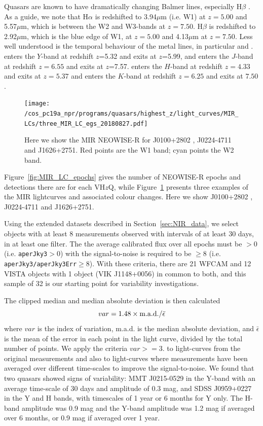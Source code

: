 \documentclass[usenatbib]{mnras}
\begin{document}
Quasars are known to have dramatically changing Balmer lines,
especially H$\beta$ \citep[e.g.,][]{LaMassa2015, Ruan2016, Runnoe2016,
Macleod2016, Gezari2017, Runco2016, YangQ2018, Assef2018, Stern2018,
Ross2018, MacLeod2019, Graham2019}. As a guide, we note that H$\alpha$
is redshifted to 3.94$\mu$m (i.e. W1) at $z=5.00$ and 5.57$\mu$m,
which is between the W2 and W3-bands at $z=7.50$.  H$\beta$ is
redshifted to 2.92$\mu$m, which is the blue edge of W1, at $z=5.00$
and 4.13$\mu$m at $z=7.50$. Less well understood is the temporal
behaviour of the metal lines, in particular \civ and \mgii.  \civ
enters the $Y$-band at redshift $z$=5.32 and exits at $z$=5.99, and
enters the $J$-band at redshift $z=6.55$ and exits at $z$=7.57. \mgii
enters the $H$-band at redshift $z=4.33$ and exits at $z=5.37$ and
enters the $K$-band at redshift $z=6.25$ and exits at $7.50$.


\begin{figure}
  \texttt{[image: /cos\_pc19a\_npr/programs/quasars/highest\_z/light\_curves/MIR\_LCs/three\_MIR\_LC\_egs\_20180827.pdf]}
  \centering
  \caption[]
  {Here we show the MIR NEOWISE-R for J0100+2802 \citep{Wu2015}, J0224-4711 and  J1626+2751. 
    Red points are the W1 band; cyan points the W2 band.} 
  \label{fig:MIR_LC_3egs}
\end{figure}
Figure~\ref{fig:MIR_LC_epochs} gives the number of NEOWISE-R epochs
and detections there are for each VH$z$Q, while
Figure~\ref{fig:MIR_LC_3egs} presents three examples of the MIR
lightcurves and associated colour changes. Here we show J0100+2802
\citep{Wu2015}, J0224-4711 and J1626+2751.

Using the extended datasets described in Section~\ref{sec:NIR_data},
we select objects with at least 8 measurements observed with intervals
of at least 30 days, in at least one filter. The the average
calibrated flux over all epochs must be $>0$ (i.e. {\tt aperJky3}$>0$)
with the signal-to-noise is required to be $\geq8$ (i.e. {\tt
aperJky3/aperJky3Err}$\geq$8). With these criteria, there are 21 WFCAM 
and 12 VISTA objects with 1 object (VIK J1148+0056) in common to both, 
and this sample of 32 is our starting
point for variability investigations.

The clipped median and median absolute deviation is then calculated
\begin{equation}
      var = 1.48 \times  {\rm m.a.d.} / \bar{\epsilon}
\end{equation}
where $var$ is the index of variation, m.a.d. is the median absolute
deviation, and $\bar{\epsilon}$ is the mean of the error in each point
in the light curve, divided by the total number of points. We apply the criteria 
$var>=3.$ to light-curves from the original measurements and also to light-curves 
where measurements have been averaged over different time-scales to improve 
the signal-to-noise. We found that two quasars showed signs of variability:
MMT J0215-0529 in the Y-band with an average time-scale of 30 days and amplitude of 0.3 mag, and 
SDSS J0959+0227 in the Y and H bands, with timescales of 1 year or 6 months 
for Y only. The H-band amplitude was 0.9 mag and the Y-band amplitude was 1.2 mag if averaged over 6 months,
or 0.9 mag if averaged over 1 year.
\end{document}
